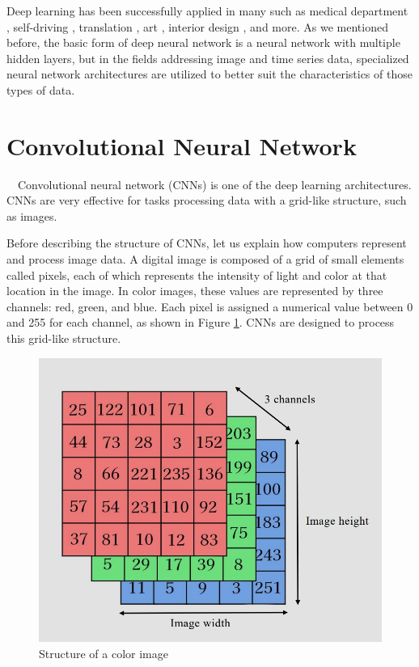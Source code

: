 Deep learning has been successfully applied in many such as medical department \cite{medical}, 
self-driving \cite{do2018real}, translation \cite{translation}, art \cite{zou2020stylized},
interior design \cite{interior}, and more.
As we mentioned before, the basic form of deep neural network is a neural network with 
multiple hidden layers, but in the fields addressing image and time series data,
specialized neural network architectures are utilized to better suit the 
characteristics of those types of data.

\section{Convolutional Neural Network}
　Convolutional neural network (CNNs) is one of the deep learning architectures. 
CNNs are very effective for tasks processing data with a grid-like structure, 
such as images.

Before describing the structure of CNNs, let us explain how computers represent 
and process image data. A digital image is composed of a grid of small elements 
called pixels, each of which represents the intensity of light and color at 
that location in the image.
In color images, these values are represented by three channels: 
red, green, and blue. Each pixel is assigned a numerical value 
between 0 and 255 for each channel, as shown in Figure \ref{structure-of-image}.
CNNs are designed to process this grid-like structure.

\begin{figure}[h]
  \centering
  \includegraphics[width=90truemm]{resources/2_background/imagedata.png}
  \caption{
    Structure of a color image
  }
  \label{structure-of-image}
\end{figure}


